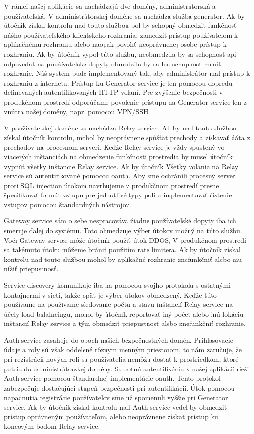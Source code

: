 V rámci našej aplikácie sa nachádzajú dve domény, administrátorská a používateľská. V administrátorskej doméne sa nachádza služba generator. Ak by útočník získal kontrolu nad touto službou bol by schopný obmedziť funkčnosť nášho používateľského klientskeho rozhrania, zamedziť prístup používateľom k aplikačnému rozhraniu alebo naopak povoliť neoprávnenej osobe prístup k rozhraniu. Ak by útočník vypol túto službu, neobmedzila by  sa schopnosť \acrshort{api} odpovedať na používateľské dopyty obmedzila  by sa len schopnosť meniť rozhranie. Náš systém bude implementovaný tak, aby administrátor mal prístup k rozhraniu z internetu. Prístup ku Generator service je len pomocou dopredu definovaných autentifikovaných HTTP volaní. Pre zvýšenie bezpečnosti v produkčnom prostredí odporúčame povolenie prístupu na Generator service len z vnútra našej domény, napr. pomocou VPN/SSH.

V používateľskej doméne sa nachádza Relay service. Ak by nad touto službou získal útočník kontrolu, mohol by neoprávnene spúšťať prechody a získavať dáta z prechodov na procesnom serveri. Keďže Relay service je vždy spustený vo viacerých inštanciách na obmedzenie funkčnosti prostredia by musel útočník vypnúť všetky inštancie Relay service. Ak by útočník Všetky volania na Relay service sú autentifikované pomocou \acrshort{oauth}.  Aby sme ochránili procesný server proti SQL injection útokom navrhujeme v produkčnom prostredí presne špecifikovať formát vstupu pre jednotlivé typy polí a  implementovať čistenie vstupov pomocou štandardných nástrojov.

Gateway service sám o sebe nespracováva žiadne používateľské dopyty iba ich smeruje ďalej do systému. Toto obmedzuje výber útokov možný na túto službu. Voči Gateway service môže útočník použiť útok DDOS, V produkčnom prostredí sa takémuto útoku môžeme brániť použitím rate limitera. Ak by útočník získal kontrolu nad touto službou mohol by aplikačné rozhranie znefunkčniť alebo mu nížiť priepustnosť.

Service discovery komunikuje iba na pomocou svojho protokolu s ostatnými kontajnermi v sieti, takže opäť je výber útokov obmedzený. Keďže túto používame na používame sledovanie počtu a stavu inštancií Relay service na účely load balalncingu, mohol by útočník reportovať iný počet alebo inú lokáciu inštancií Relay service a tým obmedziť priepustnosť alebo znefunkčniť rozhranie.

Auth service zasahuje do oboch našich bezpečnostných domén. Prihlasovacie údaje a roly sú však oddelené rôznym menným priestorom, to nám zaručuje, že pri registrácií nových rolí sa používatelia nemôžu dostať k prostriedkom, ktoré patria do administrátorskej domény. Samotnú
autentifikáciu v našej aplikácií rieši Auth service pomocou štandardnej implementácie \acrshort{oauth}. Tento protokol zabezpečuje dostačujúci stupeň bezpečnosti pri autentifikácií. Útok pomocou napadnutia registrácie používateľov sme už spomenuli vyššie pri Generator service. Ak by útočník získal kontrolu nad Auth service vedel by obmedziť prístup oprávneným používateľom, alebo neoprávnene získať prístup ku koncovým bodom Relay service.

